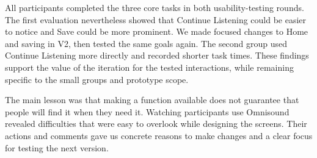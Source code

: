 All participants completed the three core tasks in both usability-testing
rounds. The first evaluation nevertheless showed that Continue Listening
could be easier to notice and Save could be more prominent. We made focused
changes to Home and saving in V2, then tested the same goals again. The
second group used Continue Listening more directly and recorded shorter
task times. These findings support the value of the iteration for the
tested interactions, while remaining specific to the small groups and
prototype scope.

The main lesson was that making a function available does not guarantee
that people will find it when they need it. Watching participants use
Omnisound revealed difficulties that were easy to overlook while designing
the screens. Their actions and comments gave us concrete reasons to make
changes and a clear focus for testing the next version.
